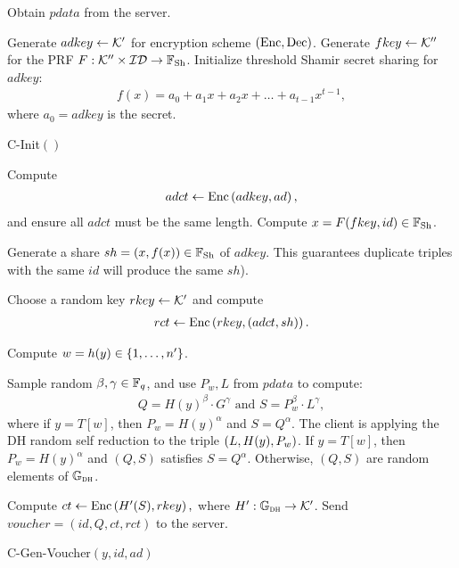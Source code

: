 \begin{algorithm}[H]
\DontPrintSemicolon
     Obtain $pdata$ from the server.\;

       Generate $adkey \gets \mathcal{K}'$ for  encryption scheme $\left(\text{Enc}, \text{Dec}\right)$.\;
       Generate $fkey \gets \mathcal{K}''$ for the PRF $F: \mathcal{K}'' \times \mathcal{ID} \to \mathbb{F}_{\text{Sh}}$.\;
       Initialize threshold {Shamir secret sharing} for $adkey$:
      \begin{align*}
      f(x) = a_0 + a_1x + a_2x + \dots + a_{t-1}x^{t-1},
      \end{align*}
      where $a_0 = adkey$ is the secret.\;

\caption{  {\sf C-Init}$()$}
\label{algo:c_init}
\end{algorithm}


\begin{algorithm}[H]
\DontPrintSemicolon
      Compute
        \begin{align*}
               adct \gets \text{Enc} \left(adkey, ad\right),
        \end{align*}        
        and ensure all $adct$ must be the same length.\;
      Compute $x = F(fkey, id) \in \mathbb{F}_{\text{Sh}}$.\;

      Generate a share $sh = \left(x, f(x)\right) \in \mathbb{F}_{\text{Sh}}$ of $adkey$. This guarantees duplicate triples with the same $id$ will produce the same $sh$).\;

      Choose a random key $rkey \gets \mathcal{K}'$ and compute 
      \begin{align*}
      rct \gets \text{Enc} \left(rkey, \left(adct, sh\right)\right). 
      \end{align*}

      Compute $w = h(y) \in \left\{1,\dots,n'\right\}$.\;

      Sample random  $\beta, \gamma \in \mathbb{F}_q$, and use $P_w,L$ from $pdata$ to compute:
     \begin{align*}
     Q = H(y)^{\beta} \cdot G^{\gamma} \text{ and } S = P_w^{\beta} \cdot L^{\gamma},
     \end{align*}
     where if $y = T[w]$, then $P_w = H(y)^{\alpha}$ and $S = Q^{\alpha}$. 
 {    
      The client is applying the DH random self reduction to the triple $\left(L, H(y), P_w\right)$. If $y = T[w]$, then $P_w = H(y)^\alpha$ and $(Q,S)$ satisfies $S = Q^\alpha$. Otherwise, $(Q,S)$ are random elements of $\mathbb{G}_{\textsc{dh}}$.}


   Compute $ct \gets \text{Enc} \left(H'(S), rkey\right),$ where $H' : \mathbb{G}_{\textsc{dh}} \to \mathcal{K}'$.\;
      Send $voucher = (id, Q, ct, rct)$ to the server.\;


\caption{  {\sf C-Gen-Voucher}$(y, id, ad)$}
\label{algo:c_gen_voucher}
\end{algorithm}


